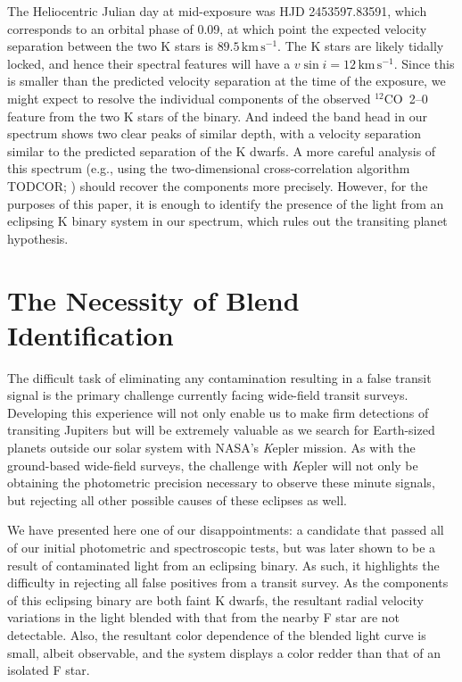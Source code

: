 The Heliocentric Julian day at mid-exposure was HJD 2453597.83591,
which corresponds to an orbital phase of 0.09, at which point the
expected velocity separation between the two K stars is
$89.5\,\mathrm{km\,s^{-1}}$.  The K stars are likely tidally locked,
and hence their spectral features will have a $v \sin{i} =
12\,\mathrm{km\,s^{-1}}$. Since this is smaller than the predicted
velocity separation at the time of the exposure, we might expect to
resolve the individual components of the observed \mbox{$^{12}$CO 2--0} feature
from the two K stars of the binary. And indeed the band head in our
spectrum shows two clear peaks of similar depth, with a velocity
separation similar to the predicted separation of the K dwarfs. A more
careful analysis of this spectrum (e.g., using the two-dimensional cross-correlation algorithm TODCOR;\@
\citealt{Zucker_Mazeh:apj:1994a}) should recover the components more
precisely. However, for the purposes of this paper, it is enough to
identify the presence of the light from an eclipsing K binary system
in our spectrum, which rules out the transiting planet hypothesis.

\section{The Necessity of Blend Identification}\label{cha:gsc:sec:dis}

The difficult task of eliminating any contamination resulting in a
false transit signal is the primary challenge currently facing wide-field transit surveys. Developing this experience will not only enable
us to make firm detections of transiting Jupiters but will be
extremely valuable as we search for Earth-sized planets outside our
solar system with NASA's {\textit Kepler} mission. As with the
ground-based wide-field surveys, the challenge with {\textit Kepler} will not
only be obtaining the photometric precision necessary to observe these
minute signals, but rejecting all other possible causes of these
eclipses as well.

We have presented here one of our disappointments: a candidate that
passed all of our initial photometric and spectroscopic tests, but was
later shown to be a result of contaminated light from an eclipsing
binary. As such, it highlights the difficulty in rejecting all false
positives from a transit survey. As the components of this eclipsing
binary are both faint K dwarfs, the resultant radial velocity
variations in the light blended with that from the nearby F star are
not detectable. Also, the resultant color dependence of the blended
light curve is small, albeit observable, and the system displays a
color redder than that of an isolated F star.

